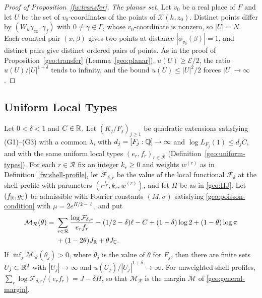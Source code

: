 \begin{proof}[Proof of Proposition~\ref{fw:transfer}]
\emph{The planar set.} Let $v_0$ be a real place of $F$ and let $U$ be
the set of $v_0$-coordinates of the points of $\mathcal X(h,z_0)$.
Distinct points differ by $(W_h\gamma_\infty,\gamma_f)$ with
$0\ne\gamma\in\Gamma$, whose $v_0$-coordinate is nonzero, so $|U|=N$.
Each counted pair $(x,\beta)$ gives two points at distance
$|\phi_{v_0}(\beta)|=1$, and distinct pairs give distinct ordered
pairs of points. As in the proof of Proposition~\ref{geo:transfer}
(Lemma~\ref{geo:planar}), $u(U)\ge\mathcal E/2$, the ratio
$u(U)/|U|^{1+\delta}$ tends to infinity, and the bound $u(U)\le|U|^2/2$
forces $|U|\to\infty$.
\end{proof}

\subsection{Uniform Local Types}

\begin{corollary}\label{fw:uniform-types}
Let $0<\delta<1$ and $C\in\mathbb R$. Let $(K_j/F_j)_{j\ge1}$ be quadratic
extensions satisfying (G1)--(G3) with a common $\lambda$, with
$d_j=[F_j:\mathbb Q]\to\infty$ and $\log L_{F_j}(1)\le d_jC$, and with the same
uniform local types $(e_r,f_r)_{r\in\mathcal R}$
(Definition~\ref{geo:uniform-types}). For each $r\in\mathcal R$ fix an
integer $k_r\ge0$ and weights $w^{(r)}$ as in
Definition~\ref{fw:shell-profile}, let $\mathcal F_{\delta,r}$ be the
value of the local functional $\mathcal F_\delta$ at the shell profile
with parameters $(r^{f_r},k_r,w^{(r)})$, and let $H$ be as in
\eqref{geo:HJ}. Let $(f_\mathbb R,g_\mathbb C)$ be admissible with Fourier constants
$(M,\sigma)$ satisfying \eqref{geo:poisson-condition} with
$\mu=2e^{H/2-\ell}$, and put
\[
 \begin{split}
 \mathcal M_{\mathcal R}(\theta)={}&
 \sum_{r\in\mathcal R}\frac{\log\mathcal F_{\delta,r}}{e_rf_r}
 -(1/2-\delta)\ell-C+(1-\delta)\log2+(1-\theta)\log\pi\\
 &+(1-2\theta)J_\mathbb R+\theta J_\mathbb C .
 \end{split}
\]
If $\inf_j\mathcal M_{\mathcal R}(\theta_j)>0$, where $\theta_j$ is the
value of $\theta$ for $F_j$, then there are finite sets
$U_j\subset\mathbb R^2$ with $|U_j|\to\infty$ and
$u(U_j)/|U_j|^{1+\delta}\to\infty$. For unweighted shell profiles,
$\sum_r\log\mathcal F_{\delta,r}/(e_rf_r)=J-\delta H$, so that
$\mathcal M_{\mathcal R}$ is the margin $\mathcal M$ of
\eqref{geo:general-margin}.
\end{corollary}


